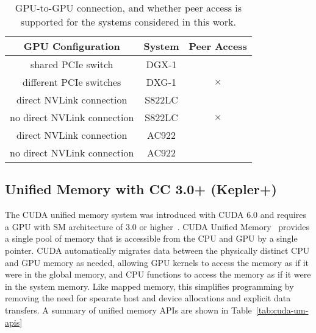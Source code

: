 \begin{table}[ht]
	\centering
	\caption[System support for GPU-GPU Peer Access]{
		GPU-to-GPU connection, and whether peer access is supported for the systems considered in this work.
	}
	\label{tab:cuda-peer-topology}
	\begin{tabular}{ccc}
		\hline
		\textbf{GPU Configuration}  & \textbf{System} &  \textbf{Peer Access} \\ \hline
		shared PCIe switch          & DGX-1           &  \checkmark           \\ \hline
		different PCIe switches     & DXG-1           &  $\times$             \\ \hline
		direct NVLink connection    & S822LC          &  \checkmark           \\ \hline
		no direct NVLink connection & S822LC          &  $\times$             \\ \hline
		direct NVLink connection    & AC922           &  \checkmark           \\ \hline
		no direct NVLink connection & AC922           &  \checkmark           \\ \hline

	\end{tabular}
\end{table}

\subsection{Unified Memory with CC 3.0+ (Kepler+)}
\label{sec:unified-cc3}

The CUDA unified memory system was introduced with CUDA 6.0 and requires a GPU with SM architecture of 3.0 or higher~\cite{nvidia2014cuda60}.
CUDA Unified Memory~\cite{harris2013cudaunifiedmemory} provides a single pool of memory that is accessible from the CPU and GPU by a single pointer.
CUDA automatically migrates data between the physically distinct CPU and GPU memory as needed, allowing GPU kernels to access the memory as if it were in the global memory, and CPU functions to access the memory as if it were in the system memory.
Like mapped memory, this simplifies programming by removing the need for spearate host and device allocations and explicit data transfers.
A summary of unified memory APIs are shown in Table~\ref{tab:cuda-um-apis}

